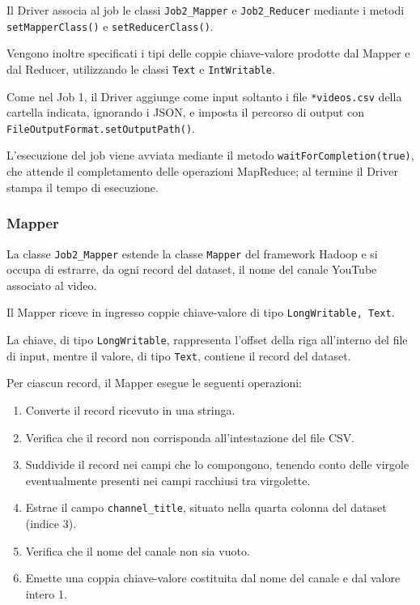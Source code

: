 \documentclass[12pt, a4paper]{article}
\begin{document}
Il Driver associa al job le classi
\texttt{Job2\_Mapper} e \texttt{Job2\_Reducer}
mediante i metodi \texttt{setMapperClass()}
e \texttt{setReducerClass()}.

Vengono inoltre specificati i tipi delle
coppie chiave-valore prodotte dal Mapper
e dal Reducer, utilizzando le classi
\texttt{Text} e \texttt{IntWritable}.

Come nel Job 1, il Driver aggiunge come input
soltanto i file \texttt{*videos.csv} della cartella
indicata, ignorando i JSON, e imposta il percorso
di output con \texttt{FileOutputFormat.setOutputPath()}.

L'esecuzione del job viene avviata mediante
il metodo \texttt{waitForCompletion(true)},
che attende il completamento delle
operazioni MapReduce; al termine il Driver
stampa il tempo di esecuzione.

\subsubsection{Mapper}

La classe \texttt{Job2\_Mapper} estende la classe
\texttt{Mapper} del framework Hadoop e si occupa
di estrarre, da ogni record del dataset, il nome
del canale YouTube associato al video.

Il Mapper riceve in ingresso coppie chiave-valore
di tipo \texttt{LongWritable, Text}.

La chiave, di tipo \texttt{LongWritable},
rappresenta l'offset della riga all'interno del
file di input, mentre il valore, di tipo
\texttt{Text}, contiene il record del dataset.

Per ciascun record, il Mapper esegue le
seguenti operazioni:

\begin{enumerate}
    \item Converte il record ricevuto in una stringa.
    \item Verifica che il record non corrisponda
    all'intestazione del file CSV.
    \item Suddivide il record nei campi che lo
    compongono, tenendo conto delle virgole
    eventualmente presenti nei campi racchiusi
    tra virgolette.
    \item Estrae il campo \texttt{channel\_title},
    situato nella quarta colonna del dataset
    (indice 3).
    \item Verifica che il nome del canale
    non sia vuoto.
    \item Emette una coppia chiave-valore
    costituita dal nome del canale e dal
    valore intero 1.
\end{enumerate}
\end{document}
